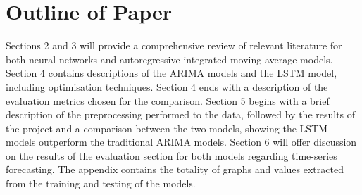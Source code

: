 \section{Outline of Paper}
Sections 2 and 3 will provide a comprehensive review of relevant literature for both neural networks and autoregressive integrated moving average models. Section 4 contains descriptions of the ARIMA models and the LSTM model, including optimisation techniques. Section 4 ends with a description of the evaluation metrics chosen for the comparison. Section 5 begins with a brief description of the preprocessing performed to the data, followed by  the results of the project and a comparison between the two models, showing the LSTM models outperform the traditional ARIMA models. Section 6 will offer discussion on the results of the evaluation section for both models regarding time-series forecasting. The appendix contains the totality of graphs and values extracted from the training and testing of the models.